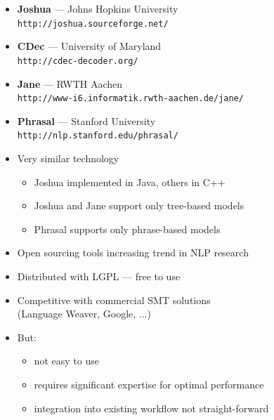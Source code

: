 \documentclass[landscape]{uedslides2C}
\begin{document}

\begin{itemize} \itemsep -3mm
\item {\bf Joshua} --- Johns Hopkins University\\
{\small \tt http://joshua.sourceforge.net/}
\item {\bf CDec} --- University of Maryland\\
{\small \tt http://cdec-decoder.org/}
\item {\bf Jane} --- RWTH Aachen\\
{\small \tt http://www-i6.informatik.rwth-aachen.de/jane/}
\item {\bf Phrasal} --- Stanford University\\
{\small \tt http://nlp.stanford.edu/phrasal/}
\item Very similar technology \vspace{-2mm}
\begin{itemize}
\item Joshua implemented in Java, others in C++
\item Joshua and Jane support only tree-based models
\item Phrasal supports only phrase-based models
\end{itemize}
\item Open sourcing tools increasing trend in NLP research
\end{itemize}


\vspace{20mm}
\begin{itemize}
\item Distributed with LGPL --- free to use
\item Competitive with commercial SMT solutions\\ (Language Weaver, Google, ...)
\item But:
\begin{itemize}
\item not easy to use
\item requires significant expertise for optimal performance
\item integration into existing workflow not straight-forward
\end{itemize}
\end{itemize}
\end{document}
